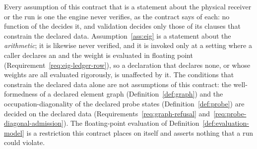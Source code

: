 
\begin{remark}\label{rem:unchecked-assumptions}
Every assumption of this contract that is a statement about the physical
receiver or the run is one the engine never verifies, as the contract says
of each: no function of the  decides it, and validation
decides only those of its clauses that constrain the declared data.
Assumption~\ref{ass:eig} is a statement about the \emph{arithmetic}; it is
likewise never verified, and it is invoked only at a setting where a caller
declares an  and the weight is evaluated in floating
point (Requirement~\ref{req:eig-ledger-row}), so a declaration that declares
none, or whose weights are all evaluated rigorously, is unaffected by it. The conditions that constrain the declared data alone are not
assumptions of this contract: the well-formedness of a declared element graph
(Definition~\ref{def:graph}) and the occupation-diagonality of the declared
probe states (Definition~\ref{def:probe}) are decided on the declared data
(Requirements~\ref{req:graph-refusal} and~\ref{req:probe-diagonal-admission}).
The floating-point evaluation of Definition~\ref{def:evaluation-model} is a
restriction this contract places on itself and asserts nothing that a run
could violate.
\end{remark}
